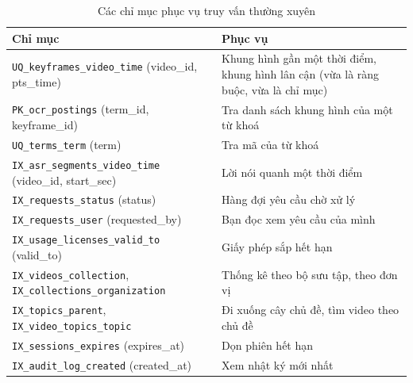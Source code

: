 \begin{table}[H]
\centering
\caption{Các chỉ mục phục vụ truy vấn thường xuyên}
\label{tab:indexes}
\renewcommand{\arraystretch}{1.2}
\begin{tabularx}{\textwidth}{>{\raggedright\arraybackslash}p{6.2cm} >{\raggedright\arraybackslash}X}
\toprule
\textbf{Chỉ mục} & \textbf{Phục vụ} \\
\midrule
\texttt{UQ\_keyframes\_video\_time} (video\_id, pts\_time) & Khung hình gần một thời điểm,
khung hình lân cận (vừa là ràng buộc, vừa là chỉ mục) \\
\texttt{PK\_ocr\_postings} (term\_id, keyframe\_id) & Tra danh sách khung hình của một từ khoá \\
\texttt{UQ\_terms\_term} (term) & Tra mã của từ khoá \\
\texttt{IX\_asr\_segments\_video\_time} (video\_id, start\_sec) & Lời nói quanh một thời điểm \\
\texttt{IX\_requests\_status} (status) & Hàng đợi yêu cầu chờ xử lý \\
\texttt{IX\_requests\_user} (requested\_by) & Bạn đọc xem yêu cầu của mình \\
\texttt{IX\_usage\_licenses\_valid\_to} (valid\_to) & Giấy phép sắp hết hạn \\
\texttt{IX\_videos\_collection}, \texttt{IX\_collections\_organization} & Thống kê theo bộ sưu tập, theo đơn vị \\
\texttt{IX\_topics\_parent}, \texttt{IX\_video\_topics\_topic} & Đi xuống cây chủ đề, tìm video theo chủ đề \\
\texttt{IX\_sessions\_expires} (expires\_at) & Dọn phiên hết hạn \\
\texttt{IX\_audit\_log\_created} (created\_at) & Xem nhật ký mới nhất \\
\bottomrule
\end{tabularx}
\end{table}
